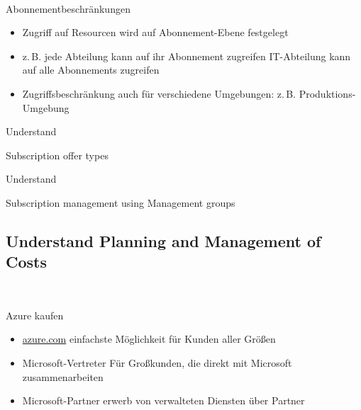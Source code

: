 \documentclass{scrartcl}
\newenvironment{flashcard}[2][]{%
    #1
    \vfill
    \centerline{\Large{#2}}
    \vfill
\newpage
}
{\newpage}
\newcommand{\subsectioncard}[1]{
    \vspace*{\stretch{1}}
    \subsection{#1}
    \vspace*{\stretch{1}}
    \pagebreak
}
\begin{document}
    \begin{flashcard}[\ ]{Abonnementbeschränkungen}
        \begin{itemize}
            \item Zugriff auf Resourcen wird auf Abonnement-Ebene festgelegt
            \item z.\,B. jede Abteilung kann auf ihr Abonnement zugreifen\newline
            IT-Abteilung kann auf alle Abonnements zugreifen
            \item Zugriffsbeschränkung auch für verschiedene Umgebungen:\newline
            z.\,B. Produktions-Umgebung
        \end{itemize}
    \end{flashcard}

    \begin{flashcard}[Understand]{Subscription offer types}

    \end{flashcard}

    \begin{flashcard}[Understand]{Subscription management using Management groups}

    \end{flashcard}

    \subsectioncard{Understand Planning and Management of Costs}

    \begin{flashcard}[\ ]{Azure kaufen}
        \begin{itemize}
            \item \href{azure.com}{azure.com}\newline
            einfachste Möglichkeit für Kunden aller Größen
            \item Microsoft-Vertreter\newline
            Für Großkunden, die direkt mit Microsoft zusammenarbeiten
            \item Microsoft-Partner\newline
            erwerb von verwalteten Diensten über Partner
        \end{itemize}
    \end{flashcard}
\end{document}
